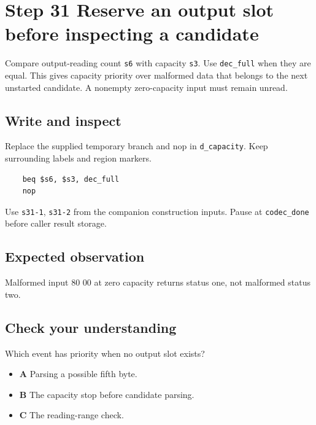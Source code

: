 \section{Step 31 Reserve an output slot before inspecting a candidate}\label{delta-s31}

Compare output-reading count \texttt{s6} with capacity \texttt{s3}. Use \texttt{dec\_full} when they are equal. This gives capacity priority over malformed data that belongs to the next unstarted candidate. A nonempty zero-capacity input must remain unread.

\subsection{Write and inspect}
Replace the supplied temporary branch and nop in \texttt{d\_capacity}. Keep surrounding labels and region markers.

\begin{verbatim}
    beq $s6, $s3, dec_full
    nop
\end{verbatim}
Use \texttt{s31-1}, \texttt{s31-2} from the companion construction inputs. Pause at \texttt{codec\_done} before caller result storage.

\subsection{Expected observation}
Malformed input 80 00 at zero capacity returns status one, not malformed status two.

\subsection{Check your understanding}
Which event has priority when no output slot exists?

\begin{itemize}
  \item \textbf{A} Parsing a possible fifth byte.
  \item \textbf{B} The capacity stop before candidate parsing.
  \item \textbf{C} The reading-range check.
\end{itemize}
